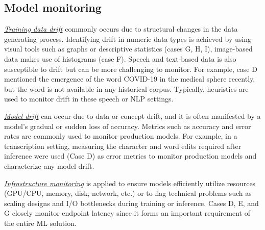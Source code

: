 

\subsection{Model monitoring} 

\underline{\emph{Training data drift}} commonly occurs due to structural changes in the data generating process. Identifying drift in numeric data types is achieved by using visual tools such as graphs or descriptive statistics (cases G, H, I), image-based data makes use of histograms (case F). Speech and text-based data is also susceptible to drift but can be more challenging to monitor. For example, case D mentioned the emergence of the word COVID-19 in the medical sphere recently, but the word is not available in any historical corpus. Typically, heuristics are used to monitor drift in these speech or NLP settings.

\underline{\emph{Model drift}} can occur due to data or concept drift, and it is often manifested by a model's gradual or sudden loss of accuracy. Metrics such as accuracy and error rates are commonly used to monitor production models. For example, in a transcription setting, measuring the character and word edits required after inference were used (Case D) as error metrics to monitor production models and characterize any model drift.

\underline{\emph{Infrastructure monitoring}}
is applied to ensure models efficiently utilize resources (GPU/CPU, memory, disk, network, etc.) or to flag technical problems such as scaling designs and I/O bottlenecks during training or inference. Cases D, E, and G closely monitor endpoint latency since it forms an important requirement of the entire ML solution.


